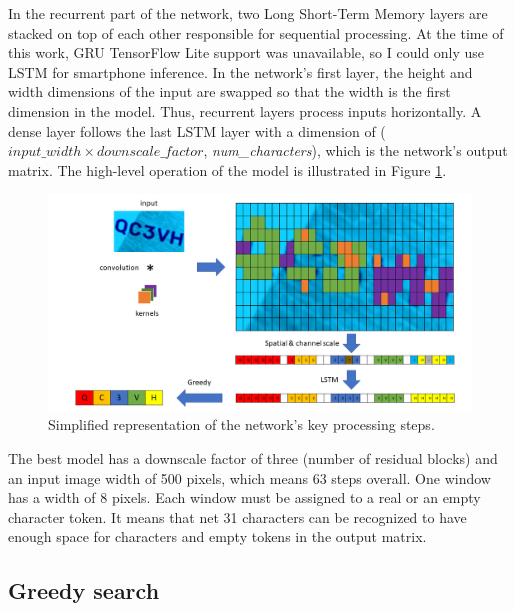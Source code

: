 In the recurrent part of the network, two Long Short-Term Memory\cite{LSTM} layers are stacked on top of each other responsible for sequential processing. At the time of this work, GRU TensorFlow Lite support was unavailable, so I could only use LSTM for smartphone inference. In the network's first layer, the height and width dimensions of the input are swapped so that the width is the first dimension in the model. Thus, recurrent layers process inputs horizontally. A dense layer follows the last LSTM layer with a dimension of (${input\_width}\times{downscale\_factor}$, \textit{num\_characters}), which is the network's output matrix. The high-level operation of the model is illustrated in Figure \ref{fig:processing_steps}.

\begin{figure}[htb]
 \centerline{\includegraphics[width=1.0\columnwidth]{.//Figure/OCR/processing_steps.png}}
 \caption{Simplified representation of the network's key processing steps.}
 \label{fig:processing_steps}
\end{figure}

The best model has a downscale factor of three (number of residual blocks) and an input image width of 500 pixels, which means 63 steps overall. One window has a width of 8 pixels. Each window must be assigned to a real or an empty character token. It means that net 31 characters can be recognized to have enough space for characters and empty tokens in the output matrix.

\subsection{Greedy search}

